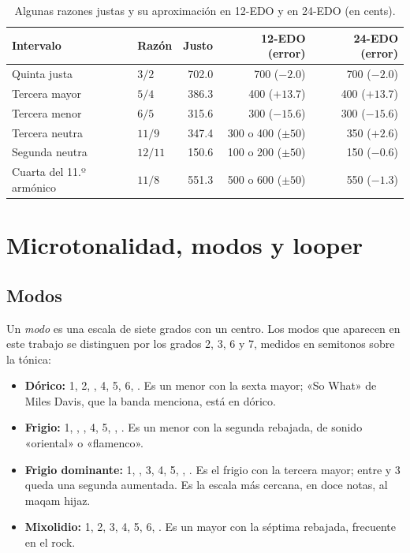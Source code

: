 \begin{table}[ht]
  \centering
  \caption{Algunas razones justas y su aproximación en 12-EDO y en 24-EDO (en cents).}\label{tab:razones}
  \begin{tabular}{@{}llrrr@{}}
    \toprule
    Intervalo & Razón & Justo & 12-EDO (error) & 24-EDO (error) \\
    \midrule
    Quinta justa & $3/2$ & 702.0 & 700 ($-2.0$) & 700 ($-2.0$) \\
    Tercera mayor & $5/4$ & 386.3 & 400 ($+13.7$) & 400 ($+13.7$) \\
    Tercera menor & $6/5$ & 315.6 & 300 ($-15.6$) & 300 ($-15.6$) \\
    Tercera neutra & $11/9$ & 347.4 & 300 o 400 ($\pm 50$) & 350 ($+2.6$) \\
    Segunda neutra & $12/11$ & 150.6 & 100 o 200 ($\pm 50$) & 150 ($-0.6$) \\
    Cuarta del 11.º armónico & $11/8$ & 551.3 & 500 o 600 ($\pm 50$) & 550 ($-1.3$) \\
    \bottomrule
  \end{tabular}
\end{table}

\section{Microtonalidad, modos y looper}\label{sec:contexto-musical}

\subsection{Modos}

Un \emph{modo} es una escala de siete grados con un centro. Los modos que aparecen en este trabajo se distinguen por
los grados 2, 3, 6 y 7, medidos en semitonos sobre la tónica:

\begin{itemize}
  \item \textbf{Dórico:} 1, 2, , 4, 5, 6, . Es un menor con la sexta mayor; «So What» de Miles Davis, que la banda
  menciona, está en dórico.
  \item \textbf{Frigio:} 1, , , 4, 5, , . Es un menor con la segunda rebajada, de sonido «oriental» o
  «flamenco».
  \item \textbf{Frigio dominante:} 1, , 3, 4, 5, , . Es el frigio con la tercera mayor; entre  y 3 queda
  una segunda aumentada. Es la escala más cercana, en doce notas, al maqam hijaz.
  \item \textbf{Mixolidio:} 1, 2, 3, 4, 5, 6, . Es un mayor con la séptima rebajada, frecuente en el rock.
\end{itemize}

